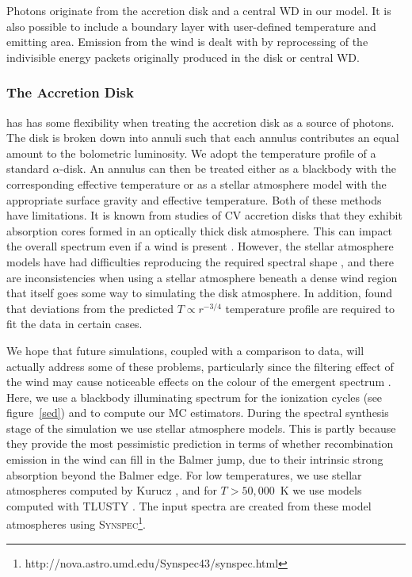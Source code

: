 \documentclass[preprint, a4paper, 11pt]{aastex}
\begin{document}
Photons originate from the accretion disk and a central WD in our model. It is also possible to include
a boundary layer with user-defined temperature and emitting area. Emission from the wind is dealt with
by reprocessing of the indivisible energy packets originally produced in the disk or central WD.

\subsubsection{The Accretion Disk}

\py has has some flexibility when treating the accretion disk as a source of photons. 
The disk is broken down into annuli 
such that each annulus contributes an equal amount to the bolometric luminosity. 
We adopt the temperature profile of a standard \cite{shakurasunyaev1973} $\alpha$-disk.
An annulus can then
be treated either as a blackbody with the corresponding effective temperature or as a stellar atmosphere model
with the appropriate surface gravity and effective temperature. 
Both of these methods have limitations. It is known
from studies of CV accretion disks that they exhibit absorption cores 
formed in an optically thick disk atmosphere.
This can impact the overall spectrum even if a wind is present 
\citep[see e.g.][]{dhillon1996}.
However, the stellar atmosphere models
have had difficulties reproducing the required spectral shape \citep{wade1988}, 
and there are inconsistencies when using a 
stellar atmosphere beneath a dense
wind region that itself goes some way to simulating the disk atmosphere. 
In addition, \cite{linnell2010} found that deviations from the predicted 
$T\propto r^{-3/4}$ temperature profile are required to fit the data
in certain cases. 

We hope that future simulations, coupled with a comparison to data, will 
actually address some of these problems, particularly since
the filtering effect of the wind may cause noticeable effects
on the colour of the emergent spectrum \citep{hassall}. 
Here, we use a blackbody illuminating spectrum
for the ionization cycles (see figure~\ref{sed}) and to compute our MC estimators.
During the spectral synthesis stage of the simulation we use stellar atmosphere models.
This is partly because they provide the most pessimistic prediction in terms of whether recombination emission in the 
wind can fill in the Balmer jump, due to their intrinsic strong absorption beyond the Balmer edge.
For low temperatures, we use stellar atmospheres computed 
by Kurucz \citep{kurucz1991}, and for $T>50,000$~K we use models computed with 
\textsc{TLUSTY} \citep{tlusty}. The input spectra are created from these model
atmospheres using \textsc{Synspec}\footnote{http://nova.astro.umd.edu/Synspec43/synspec.html}.
\end{document}
